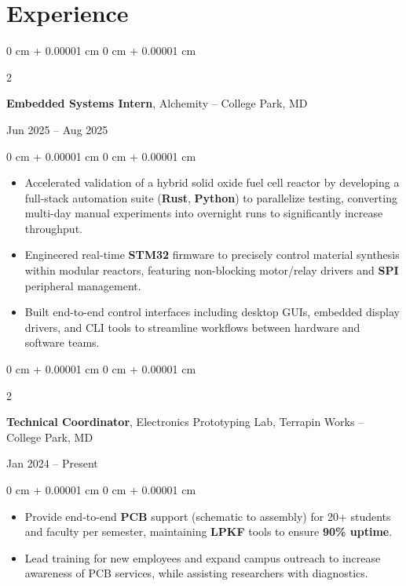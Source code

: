 \documentclass[10pt, letterpaper]{article}
\newenvironment{highlights}{
    \begin{itemize}[
        topsep=0.05 cm,
        parsep=0.05 cm,
        partopsep=0pt,
        itemsep=0pt,
        leftmargin=0 cm + 10pt
    ]
}{
    \end{itemize}
}
\newenvironment{onecolentry}{
    \begin{adjustwidth}{
        0 cm + 0.00001 cm
    }{
        0 cm + 0.00001 cm
    }
}{
    \end{adjustwidth}
}
\newenvironment{twocolentry}[2][]{
    \onecolentry
    \def\secondColumn{#2}
    \setcolumnwidth{\fill, 4.5 cm}
    \begin{paracol}{2}
}{
    \switchcolumn \raggedleft \secondColumn
    \end{paracol}
    \endonecolentry
}
\begin{document}
    \section{Experience}

        \begin{twocolentry}{
            Jun 2025 – Aug 2025
        }
            \textbf{Embedded Systems Intern}, Alchemity -- College Park, MD
        \end{twocolentry}
        \vspace{0.05 cm}
        \begin{onecolentry}
            \begin{highlights}
                \item Accelerated validation of a hybrid solid oxide fuel cell reactor by developing a full-stack automation suite (\textbf{Rust}, \textbf{Python}) to parallelize testing, converting multi-day manual experiments into overnight runs to significantly increase throughput.
                \item Engineered real-time \textbf{STM32} firmware to precisely control material synthesis within modular reactors, featuring non-blocking motor/relay drivers and \textbf{SPI} peripheral management.
                \item Built end-to-end control interfaces including desktop GUIs, embedded display drivers, and CLI tools to streamline workflows between hardware and software teams.
            \end{highlights}
        \end{onecolentry}

        \vspace{0.10 cm}

        \begin{twocolentry}{
            Jan 2024 – Present
        }
            \textbf{Technical Coordinator}, Electronics Prototyping Lab, Terrapin Works -- College Park, MD
        \end{twocolentry}
        \vspace{0.05 cm}
        \begin{onecolentry}
            \begin{highlights}
                \item Provide end-to-end \textbf{PCB} support (schematic to assembly) for 20+ students and faculty per semester, maintaining \textbf{LPKF} tools to ensure \textbf{90\% uptime}.
                \item Lead training for new employees and expand campus outreach to increase awareness of PCB services, while assisting researchers with diagnostics.
            \end{highlights}
        \end{onecolentry}
\end{document}
